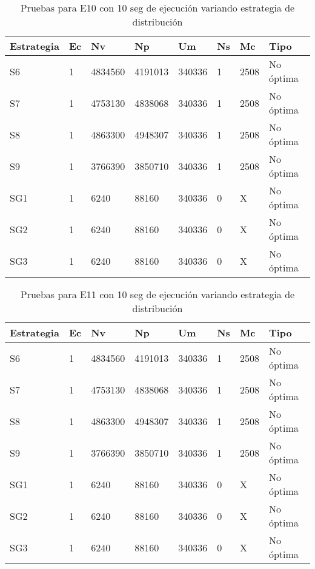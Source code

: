 \begin{center}
\begin{longtable}{|p{3cm}|p{1.0cm}|p{1.6cm}|p{1.6cm}|p{1.1cm}|p{1.1cm}|p{1.1cm}|p{2.7cm}|}
	\caption{Pruebas para E10 con 10 seg de ejecución variando estrategia de distribución} \\
	\hline
	\cellcolor[gray]{0.9} \textbf{Estrategia} & \cellcolor[gray]{0.9}\textbf{Ec} & \cellcolor[gray]{0.9}\textbf{Nv} & \cellcolor[gray]{0.9}\textbf{Np} & \cellcolor[gray]{0.9}\textbf{Um} & \cellcolor[gray]{0.9}\textbf{Ns} &  \cellcolor[gray]{0.9}\textbf{Mc} & \cellcolor[gray]{0.9}\textbf{Tipo}\\	\hline
	S6& 1 &4834560  &4191013 &340336  &1 &2508&No óptima \\
	\hline
	S7& 1 &4753130  &4838068 &340336  &1 &2508&No óptima \\
	\hline
	S8& 1 &4863300  &4948307 &340336  &1 &2508&No óptima \\
	\hline
	S9& 1 &3766390  &3850710 &340336  &1 &2508&No óptima \\
	\hline
	SG1& 1 &6240  &88160 &340336  &0 &X&No óptima \\
	\hline
	SG2& 1 &6240  &88160 &340336  &0 &X&No óptima \\
	\hline
	SG3& 1 &6240  &88160 &340336  &0 &X&No óptima \\
	\hline
\end{longtable}	
\end{center}

\begin{center}
\begin{longtable}{|p{3cm}|p{1.0cm}|p{1.6cm}|p{1.6cm}|p{1.1cm}|p{1.1cm}|p{1.1cm}|p{2.7cm}|}
	\caption{Pruebas para E11 con 10 seg de ejecución variando estrategia de distribución} \\
	\hline
	\cellcolor[gray]{0.9} \textbf{Estrategia} & \cellcolor[gray]{0.9}\textbf{Ec} & \cellcolor[gray]{0.9}\textbf{Nv} & \cellcolor[gray]{0.9}\textbf{Np} & \cellcolor[gray]{0.9}\textbf{Um} & \cellcolor[gray]{0.9}\textbf{Ns} &  \cellcolor[gray]{0.9}\textbf{Mc} & \cellcolor[gray]{0.9}\textbf{Tipo}\\	\hline
	S6& 1 &4834560  &4191013 &340336  &1 &2508&No óptima \\
	\hline
	S7& 1 &4753130  &4838068 &340336  &1 &2508&No óptima \\
	\hline
	S8& 1 &4863300  &4948307 &340336  &1 &2508&No óptima \\
	\hline
	S9& 1 &3766390  &3850710 &340336  &1 &2508&No óptima \\
	\hline
	SG1& 1 &6240  &88160 &340336  &0 &X&No óptima \\
	\hline
	SG2& 1 &6240  &88160 &340336  &0 &X&No óptima \\
	\hline
	SG3& 1 &6240  &88160 &340336  &0 &X&No óptima \\
	\hline
\end{longtable}	
\end{center}

